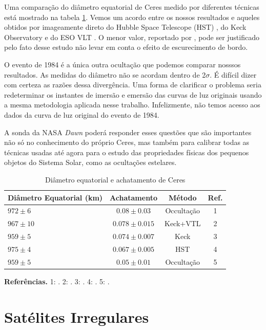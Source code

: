 \documentclass[12pt,a4paper]{monografia}
\begin{document}
Uma comparação do diâmetro equatorial de Ceres medido por diferentes técnicas está mostrado na tabela \ref{Tab: Ceres-final}. Vemos um acordo entre os nossos resultados e aqueles obtidos por imageamente direto do Hubble Space Telescope (HST) \citep{Thomas2005}, do Keck Observatory e do ESO VLT \citep{Drummond2014}. O menor valor, reportado por \cite{Carry2008}, pode ser justificado pelo fato desse estudo não levar em conta o efeito de escurecimento de bordo.

O evento de 1984 \citep{Millis1987} é a única outra ocultação que podemos comparar nosssos resultados. As medidas do diâmetro não se acordam dentro de 2$\sigma$. É difícil dizer com certeza as razões dessa divergência. Uma forma de clarificar o problema seria redeterminar os instantes de imersão e emersão das curvas de luz originais usando a mesma metodologia aplicada nesse trabalho. Infelizmente, não temos acesso aos dados da curva de luz original do evento de 1984.

A sonda da NASA \textit{Dawn} poderá responder esses questões que são importantes não só no conhecimento do próprio Ceres, mas também para calibrar todas as técnicas usadas até agora para o estudo das propriedades físicas dos pequenos objetos do Sistema Solar, como as ocultações estelares.

\begin{table}[h]
  \caption{Diâmetro equatorial e achatamento de Ceres \label{Tab: Ceres-final}}
  \begin{centering}
  \begin{tabular}{@{}lccc}
  \hline
     Diâmetro Equatorial (km) & Achatamento & Método & Ref. \\
\hline
$972 \pm 6$  & $0.08  \pm 0.03$  & Occultação & 1\\
$967 \pm 10$ & $0.078 \pm 0.015$ & Keck+VTL    & 2\\
$959 \pm 5$  & $0.074 \pm 0.007$ & Keck        & 3\\
$975 \pm 4$  & $0.067 \pm 0.005$ & HST         & 4\\
$959 \pm 5$  & $0.05  \pm 0.01$  & Occultação & 5\\
\hline
\end{tabular}
\par\end{centering}
\textbf{Referências.} 1: \cite{GomesJunior2015-Ceres}. 2: \cite{Drummond2014}. 3: \cite{Carry2008}. 4: \cite{Thomas2005}. 5: \cite{Millis1987}.
\end{table}


\section{Satélites Irregulares}
\label{Sec: Irregulares}
\end{document}
